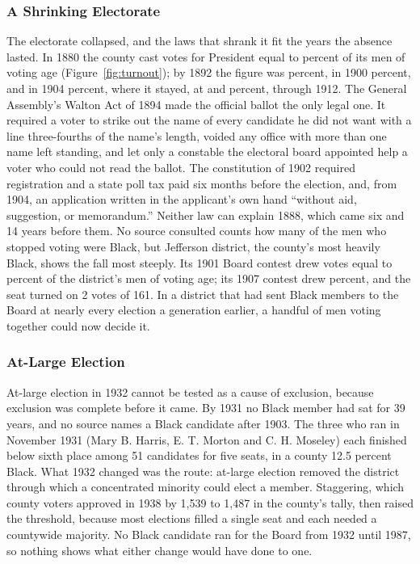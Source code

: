 \subsubsection{A Shrinking Electorate}

The electorate collapsed, and the laws that shrank it fit the years the absence
lasted. In 1880 the county cast votes for President equal to
\turnoutEighteenEighty{} percent of its men of voting age
(Figure~\ref{fig:turnout}); by 1892 the figure was
\turnoutEighteenNinetyTwo{} percent, in 1900 \turnoutNineteenHundred{} percent,
and in 1904 \turnoutNineteenFour{} percent, where it stayed, at
\turnoutNineteenEight{} and \turnoutNineteenTwelve{} percent, through 1912.
The General Assembly's Walton Act of 1894 made the
official ballot the only legal one. It required a voter to strike out the name
of every candidate he did not want with a line three-fourths of the name's
length, voided any office with more than one name left standing, and let only a
constable the electoral board appointed help a voter who could not read the
ballot.\autocite[secs.~3, 11, 15]{waltonact1894} The constitution of 1902
required registration and a state poll tax paid six months before the election,
and, from 1904, an application written in the applicant's own hand ``without
aid, suggestion, or memorandum.''\autocite[art.~II, secs.~18--21]{vaconstitution1902}
Neither law can explain 1888, which came six and 14 years before them. No source
consulted counts how many of the men who stopped voting were Black, but Jefferson
district, the county's most heavily Black, shows the fall most steeply. Its
1901 Board contest drew votes equal to \boardTurnoutJeffersonNineteenOne{}
percent of the district's men of voting age; its 1907 contest drew
\boardTurnoutJeffersonNineteenSeven{} percent, and the seat turned on 2 votes
of 161. In a district that had sent
Black members to the Board at nearly every election a generation earlier, a
handful of men voting together could now decide it.

\subsubsection{At-Large Election}

At-large election in 1932 cannot be tested as a cause of exclusion, because
exclusion was complete before it came. By 1931 no Black member had sat for 39
years, and no source names a Black candidate after 1903. The three who ran in
November 1931 (Mary B. Harris, E. T. Morton and C. H. Moseley) each finished
below sixth place among 51 candidates for five seats, in a county 12.5 percent
Black.\autocite[67]{anderson1958} What 1932 changed was the route: at-large
election removed the district through which a concentrated minority could elect
a member. Staggering, which county voters approved in 1938 by 1,539 to 1,487 in
the county's tally, then raised the threshold, because most elections filled a
single seat and each needed a countywide
majority.\autocite[11]{arlingtonelections2021} No Black candidate ran for the
Board from 1932 until 1987, so nothing shows what either change would have done
to one.\autocite[22--23]{pratt1995}\fnsep\autocite[217--218]{bestebreurtje2017}


